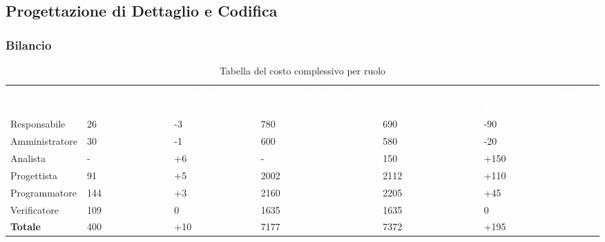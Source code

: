 \subsection{Progettazione di Dettaglio e Codifica}
\subsubsection{Bilancio}

{
\renewcommand{\arraystretch}{2}
\begin{longtable}[h]{ C{2.5cm} C{2.5cm} C{2.5cm} C{2.5cm} C{1.5cm} C{2.5cm}}
\caption{Tabella del costo complessivo per ruolo}\\

\textcolor{white}{\textbf{Ruolo}} & 
\textcolor{white}{\textbf{Ore preventivate}} & 
\textcolor{white}{\textbf{Variazione oraria}} & 
\textcolor{white}{\textbf{Costo preventivato (in \euro{})}} & 
\textcolor{white}{\textbf{Costo effettivo (in \euro{})}} & 
\textcolor{white}{\textbf{Variazione di costo (in \euro{})}}\\	
	
Responsabile    &  26 &  -3 &  780 &  690 &  -90 \\
Amministratore  &  30 &  -1 &  600 &  580 &  -20 \\
Analista        &   - &  +6 &    - &  150 & +150 \\
Progettista     &  91 &  +5 & 2002 & 2112 & +110 \\
Programmatore   & 144 &  +3 & 2160 & 2205 &  +45 \\
Verificatore    & 109 &   0 & 1635 & 1635 &    0 \\
\textbf{Totale} & 400 & +10 & 7177 & 7372 & +195 \\	

\end{longtable}
}

